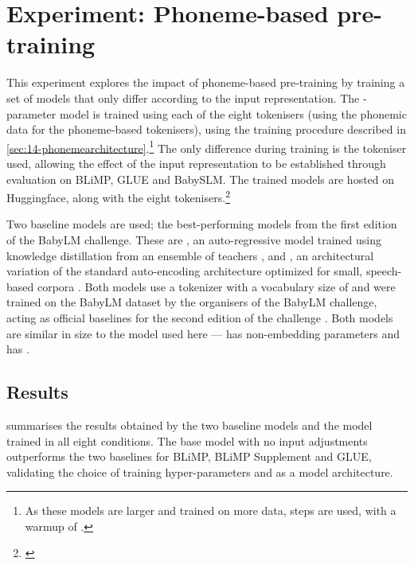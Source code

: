 \section{Experiment: Phoneme-based pre-training}\label{sec:14-phonemepretraining}

This experiment explores the impact of phoneme-based pre-training by training a set of models that only differ according to the input representation. The -parameter \gpt model is trained using each of the eight tokenisers (using the phonemic data for the phoneme-based tokenisers), using the training procedure described in \cref{sec:14-phonemearchitecture}.\footnote{As these models are larger and trained on more data,  steps are used, with a warmup of .} The only difference during training is the tokeniser used, allowing the effect of the input representation to be established through evaluation on BLiMP, GLUE and BabySLM. The trained models are hosted on Huggingface, along with the eight tokenisers.\footnote{\href{https://huggingface.co/collections/phonemetransformers/from-babble-to-words-66e068b54765a48ff30273c9}{}}

Two baseline models are used; the best-performing models from the first edition of the BabyLM challenge. These are , an auto-regressive model trained using knowledge distillation from an ensemble of teachers \citep{timiryasov-tastet-2023-baby}, and , an architectural variation of the standard auto-encoding \bert architecture optimized for small, speech-based corpora \citep{samuel-etal-2023-trained, charpentier-samuel-2023-layers}. Both models use a \bpe tokenizer with a vocabulary size of  and were trained on the BabyLM dataset by the organisers of the BabyLM challenge, acting as official baselines for the second edition of the challenge \citep{hu-etal-2024-findings}. Both models are similar in size to the \gpt model used here ---  has  non-embedding parameters and  has .

\subsection{Results}

 summarises the results obtained by the two baseline models and the \gpt model trained in all eight conditions. %
The base \gpt model with no input adjustments outperforms the two baselines for BLiMP, BLiMP Supplement and GLUE, validating the choice of training hyper-parameters and \gpt as a model architecture.

